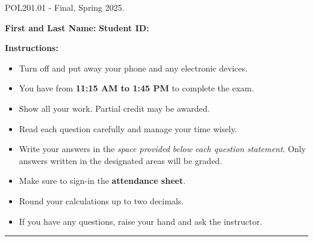 \documentclass{article}
\begin{document}
 \hspace{1em} \vspace{-1.7em} %
\begin{center}
   \Large    POL201.01 - Final, Spring 2025.
\end{center}

\vspace{1em}
\noindent\textbf{First and Last Name:} \underline{\hspace{8cm}}  \quad  \textbf{Student ID:} \underline{\hspace{4.4cm}}

\vspace{0.7em}
\noindent\textbf{Instructions:}

\vspace{-0.8em}
\begin{itemize}
    \setlength{\itemsep}{-0.35em}
    \item Turn off and put away your phone and any electronic devices.
    \item You have from \textbf{11:15 AM to 1:45 PM} to complete the exam.
    \item Show all your work. Partial credit may be awarded.
    \item Read each question carefully and manage your time wisely.
    \item Write your answers in the \emph{space provided below each question statement}. Only answers written in the designated areas will be graded.
    \item Make sure to sign-in the \textbf{attendance sheet}.
    \item Round your calculations up to two decimals.
    \item If you have any questions, raise your hand and ask the instructor.
\end{itemize}
\vspace{-1.1em}
\noindent\rule{\linewidth}{0.4pt} %

\end{document}

